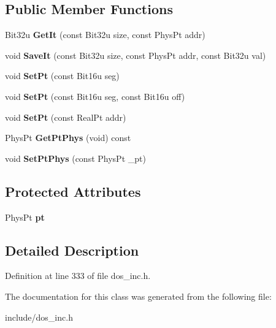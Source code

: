 \subsection*{Public Member Functions}
\begin{DoxyCompactItemize}
\item 
\hypertarget{classMemStruct_afa4f8877310aae5a757f4a30849a8f2d}{Bit32u {\bfseries Get\-It} (const Bit32u size, const Phys\-Pt addr)}\label{classMemStruct_afa4f8877310aae5a757f4a30849a8f2d}

\item 
\hypertarget{classMemStruct_a08aec3ad8437348b1f0c10c75c0e2e88}{void {\bfseries Save\-It} (const Bit32u size, const Phys\-Pt addr, const Bit32u val)}\label{classMemStruct_a08aec3ad8437348b1f0c10c75c0e2e88}

\item 
\hypertarget{classMemStruct_ae25851c2bd89342f26deba24e6e4fb5a}{void {\bfseries Set\-Pt} (const Bit16u seg)}\label{classMemStruct_ae25851c2bd89342f26deba24e6e4fb5a}

\item 
\hypertarget{classMemStruct_a67b18fbe231d442bd3b1ea904790ff14}{void {\bfseries Set\-Pt} (const Bit16u seg, const Bit16u off)}\label{classMemStruct_a67b18fbe231d442bd3b1ea904790ff14}

\item 
\hypertarget{classMemStruct_a56f200b767f2093bc73c55ca1e3a1e91}{void {\bfseries Set\-Pt} (const Real\-Pt addr)}\label{classMemStruct_a56f200b767f2093bc73c55ca1e3a1e91}

\item 
\hypertarget{classMemStruct_ac95ec2acc379f1f7ce1e46683e8109b2}{Phys\-Pt {\bfseries Get\-Pt\-Phys} (void) const }\label{classMemStruct_ac95ec2acc379f1f7ce1e46683e8109b2}

\item 
\hypertarget{classMemStruct_a89dcb5f72ec074234fd8045b0ccd05f0}{void {\bfseries Set\-Pt\-Phys} (const Phys\-Pt \-\_\-pt)}\label{classMemStruct_a89dcb5f72ec074234fd8045b0ccd05f0}

\end{DoxyCompactItemize}
\subsection*{Protected Attributes}
\begin{DoxyCompactItemize}
\item 
\hypertarget{classMemStruct_acac6123c566805e45fb8ff9e7744d3e2}{Phys\-Pt {\bfseries pt}}\label{classMemStruct_acac6123c566805e45fb8ff9e7744d3e2}

\end{DoxyCompactItemize}


\subsection{Detailed Description}


Definition at line 333 of file dos\-\_\-inc.\-h.



The documentation for this class was generated from the following file\-:\begin{DoxyCompactItemize}
\item 
include/dos\-\_\-inc.\-h\end{DoxyCompactItemize}

